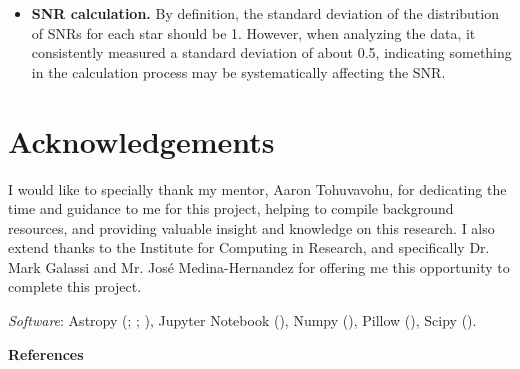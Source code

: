 \documentclass{article}
\begin{document}
\begin{multicols}{2}
\begin{itemize}
\item \textbf{SNR calculation.} By definition, the standard deviation of the distribution of SNRs for each star should be 1. However, when analyzing the data, it consistently measured a standard deviation of about 0.5, indicating something in the calculation process may be systematically affecting the SNR.

\end{itemize}

\section{Acknowledgements}
I would like to specially thank my mentor, Aaron Tohuvavohu, for dedicating the time and guidance to me for this project, helping to compile background resources, and providing valuable insight and knowledge on this research. I also extend thanks to the Institute for Computing in Research, and specifically Dr. Mark Galassi and Mr. José Medina-Hernandez for offering me this opportunity to complete this project.

\textit{Software}: Astropy (\cite{astropy:2013}; \citeyear{astropy:2018}; \citeyear{astropy:2022}), Jupyter Notebook (\cite{jupyter}), Numpy (\cite{numpy}), Pillow (\cite{pillow}), Scipy (\cite{scipy}).

\end{multicols}

\begin{center}
    \Large
    \textbf{References}
\end{center}

\printbibliography[heading=none]
\end{document}
